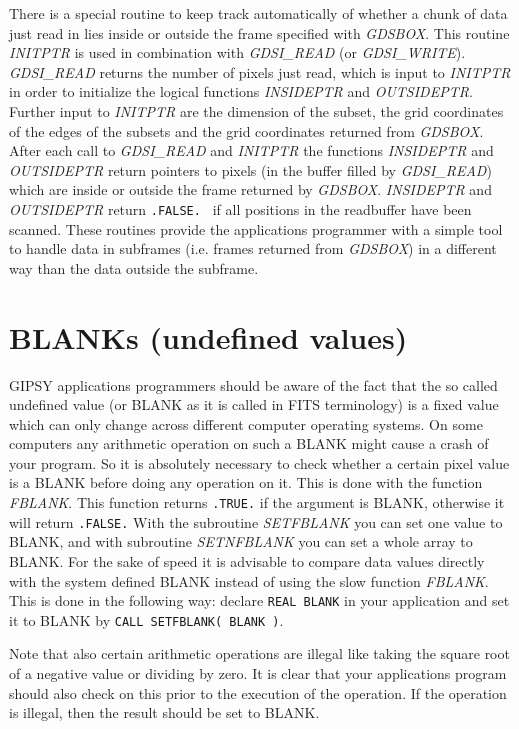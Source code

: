 There is a special routine to keep track automatically of whether a
chunk of data just read in lies inside or outside the frame specified
with {\sl GDSBOX\/}.  This routine {\sl INITPTR\/} is used in
combination with {\sl GDSI\_READ\/} (or {\sl GDSI\_WRITE\/}).  {\sl
GDSI\_READ\/} returns the number of pixels just read, which is input to
{\sl INITPTR\/} in order to initialize the logical functions {\sl
INSIDEPTR\/} and {\sl OUTSIDEPTR\/}.  Further input to {\sl INITPTR\/}
are the dimension of the subset, the grid coordinates of the edges of
the subsets and the grid coordinates returned from {\sl GDSBOX\/}.
After each call to {\sl GDSI\_READ\/} and {\sl INITPTR\/} the functions
{\sl INSIDEPTR\/} and {\sl OUTSIDEPTR\/} return pointers to pixels (in
the buffer filled by {\sl GDSI\_READ\/}) which are inside or outside the
frame returned by {\sl GDSBOX\/}.  {\sl INSIDEPTR\/} and {\sl
OUTSIDEPTR\/} return {\tt .FALSE.  } if all positions in the readbuffer
have been scanned.  These routines provide the applications programmer
with a simple tool to handle data in subframes (i.e.  frames returned
from {\sl GDSBOX\/}) in a different way than the data outside the
subframe.

\section{BLANKs (undefined values)}

GIPSY applications programmers should be aware of the fact that the so
called undefined value (or BLANK as it is called in FITS terminology) is
a fixed value which can only change across different computer operating
systems.  On some computers any arithmetic operation on such a BLANK
might cause a crash of your program.  So it is absolutely necessary to
check whether a certain pixel value is a BLANK before doing any
operation on it.  This is done with the function {\sl FBLANK\/}.  This
function returns {\tt .TRUE.} if the argument is BLANK, otherwise it
will return {\tt .FALSE.} With the subroutine {\sl SETFBLANK\/} you can
set one value to BLANK, and with subroutine {\sl SETNFBLANK\/} you can
set a whole array to BLANK.  For the sake of speed it is advisable to
compare data values directly with the system defined BLANK instead of
using the slow function {\sl FBLANK\/}.  This is done in the following
way: declare {\tt REAL BLANK} in your application and set it to BLANK by
{\tt CALL SETFBLANK( BLANK )}.

Note that also certain arithmetic operations are illegal like taking the
square root of a negative value or dividing by zero.  It is clear that
your applications program should also check on this prior to the
execution of the operation.  If the operation is illegal, then the
result should be set to BLANK.


